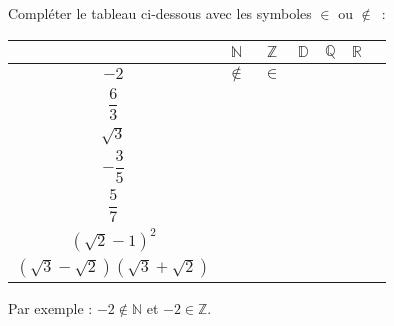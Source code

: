 
Compléter le tableau ci-dessous avec les symboles $\in$ ou $\notin$~:
\begin{center}
     \begin{tabular}{|c|c|c|c|c|c|c|} %
          \hline
          &  $\mathbb{N}$ &   $\mathbb{Z}$  &  $\mathbb{D}$  &  $\mathbb{Q}$  &  $\mathbb{R}$
          \\ \hline
          $-2$  &  $\notin$ & $\in$   &   &   &
          \\ \hline
          $\dfrac{6}{3}$  &   &   &   &   &
          \\ \hline
          $ \sqrt{3}$  &   &   &   &   &
          \\ \hline
          $ -\dfrac{3}{5} $&   &  &   &   &
          \\ \hline
          $\dfrac{5}{7}$  &   &  &   &   &
          \\ \hline
          $\left(\sqrt{2}-1\right)^2$  &   &  &   &   &
          \\ \hline
          $\left(\sqrt{3}-\sqrt{2}\right)\left(\sqrt{3}+\sqrt{2}\right)$  &   &  &   &   &
          \\ \hline
     \end{tabular}
\end{center}
Par exemple : $-2 \notin \mathbb{N}$ et $-2 \in \mathbb{Z}.$
